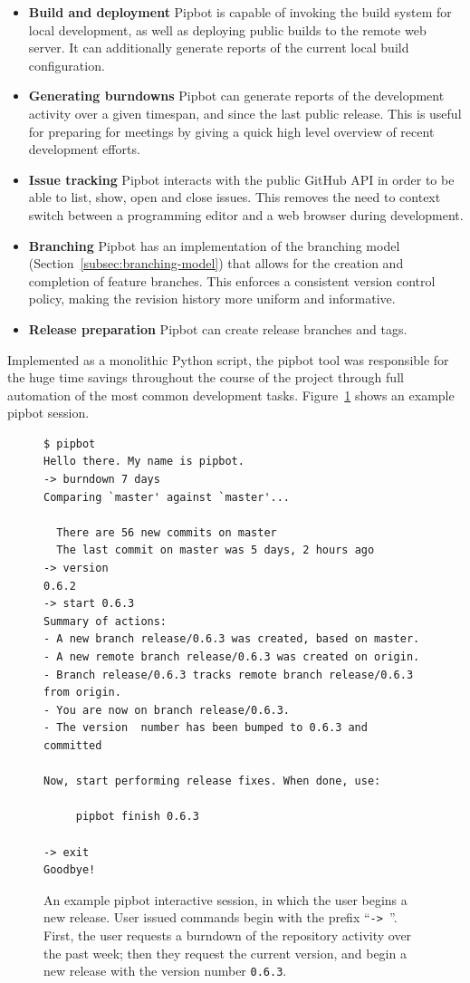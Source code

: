 \begin{itemize}
\item \textbf{Build and deployment} Pipbot is capable of invoking the
  build system for local development, as well as deploying public
  builds to the remote web server. It can additionally generate
  reports of the current local build configuration.
\item \textbf{Generating burndowns} Pipbot can generate reports of the
  development activity over a given timespan, and since the last
  public release. This is useful for preparing for meetings by giving
  a quick high level overview of recent development efforts.
\item \textbf{Issue tracking} Pipbot interacts with the public GitHub
  API in order to be able to list, show, open and close issues. This
  removes the need to context switch between a programming editor and
  a web browser during development.
\item \textbf{Branching} Pipbot has an implementation of the branching
  model (Section~\ref{subsec:branching-model}) that allows for the
  creation and completion of feature branches. This enforces a
  consistent version control policy, making the revision history more
  uniform and informative.
\item \textbf{Release preparation} Pipbot can create release branches
  and tags.
\end{itemize}

\newpage
Implemented as a monolithic Python script, the pipbot tool was
responsible for the huge time savings throughout the course of the
project through full automation of the most common development
tasks. Figure~\ref{fig:pipbot-session} shows an example pipbot
session.

\br{}


\begin{figure}[H]
\begin{verbatim}
$ pipbot
Hello there. My name is pipbot.
-> burndown 7 days
Comparing `master' against `master'...

  There are 56 new commits on master
  The last commit on master was 5 days, 2 hours ago
-> version
0.6.2
-> start 0.6.3
Summary of actions:
- A new branch release/0.6.3 was created, based on master.
- A new remote branch release/0.6.3 was created on origin.
- Branch release/0.6.3 tracks remote branch release/0.6.3 from origin.
- You are now on branch release/0.6.3.
- The version  number has been bumped to 0.6.3 and committed

Now, start performing release fixes. When done, use:

     pipbot finish 0.6.3

-> exit
Goodbye!
\end{verbatim}
\caption[Example pipbot session]
  {An example pipbot interactive session, in which the user begins a
   new release. User issued commands begin with the prefix
   ``\texttt{-> }''. First, the user requests a burndown of the
   repository activity over the past week; then they request the
   current version, and begin a new release with the version number
   \texttt{0.6.3}.}
\label{fig:pipbot-session}
\end{figure}
